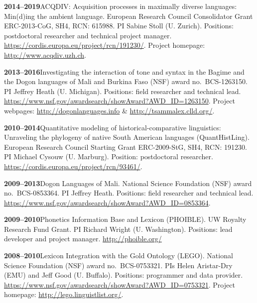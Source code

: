 \documentclass[11pt]{article}
\newcommand{\hangpara}{
 \setlength{\parindent}{0in} %
 \hangindent=0.42in %
}
\begin{document}
\vskip 6pt
\hangpara
{\bf 2014--2019}\hspace{1ex}ACQDIV: Acquisition processes in maximally diverse languages: Min(d)ing the ambient language. European Research Council Consolidator Grant ERC-2013-CoG, SH4, RCN: 615988. PI Sabine Stoll (U. Zurich). Positions: postdoctoral researcher and technical project manager. \url{https://cordis.europa.eu/project/rcn/191230/}. Project homepage: \url{http://www.acqdiv.uzh.ch}. %

\vskip 6pt
\hangpara
{\bf 2013--2016}\hspace{1ex}Investigating the interaction of tone and syntax in the Bagime and the Dogon languages of Mali and Burkina Faso (NSF) award no.\ BCS-1263150. PI Jeffrey Heath (U. Michigan). Positions: field researcher and technical lead. \url{https://www.nsf.gov/awardsearch/showAward?AWD_ID=1263150}. Project webpages: \url{http://dogonlanguages.info} \& \url{http://tsammalex.clld.org/}.

\vskip 6pt
\hangpara
{\bf 2010--2014}\hspace{1ex}Quantitative modeling of historical-comparative linguistics: Unraveling the phylogeny of native South American languages (QuantHistLing). European Research Council Starting Grant ERC-2009-StG, SH4, RCN: 191230. PI Michael Cysouw (U. Marburg). Position: postdoctoral researcher. \url{https://cordis.europa.eu/project/rcn/93461/}.

\vskip 6pt
\hangpara
{\bf 2009--2013}\hspace{1ex}Dogon Languages of Mali. National Science Foundation (NSF) award no.\ BCS-0853364. PI Jeffrey Heath. Positions: field researcher and technical lead. \url{https://www.nsf.gov/awardsearch/showAward?AWD_ID=0853364}.

\vskip 6pt
\hangpara
{\bf 2009--2010}\hspace{1ex}Phonetics Information Base and Lexicon (PHOIBLE). UW Royalty Research Fund Grant. PI Richard Wright (U. Washington). Positions: lead developer and project manager. \url{http://phoible.org/}

\vskip 6pt
\hangpara
{\bf 2008--2010}\hspace{1ex}Lexicon Integration with the Gold Ontology (LEGO). National Science Foundation (NSF) award no.\ BCS-0753321. PIs Helen Aristar-Dry (EMU) and Jeff Good (U. Buffalo). Positions: programmer and data provider. \url{https://www.nsf.gov/awardsearch/showAward?AWD_ID=0753321}. Project homepage: \url{http://lego.linguistlist.org/}.
\end{document}

